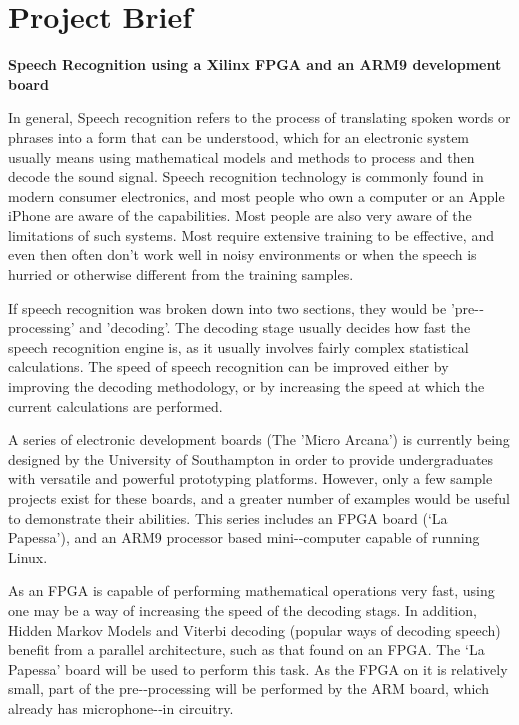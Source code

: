 \chapter{Project Brief} %
\label{apdx:brief}

\begin{center}
\textbf{Speech Recognition using a Xilinx FPGA and an ARM9 development board}
\end{center}

In general, Speech recognition refers to the process of translating spoken words or phrases into a form that can be understood, which for an electronic system usually means using mathematical models and methods to process and then decode the sound signal. Speech recognition technology is commonly found in modern consumer electronics, and most people who own a computer or an Apple iPhone are aware of the capabilities. Most people are also very aware of the limitations of such systems. Most require extensive training to be effective, and even then often don't work well in noisy environments or when the speech is hurried or otherwise different from the training samples.

If speech recognition was broken down into two sections, they would be 'pre-­‐ processing' and 'decoding'. The decoding stage usually decides how fast the speech recognition engine is, as it usually involves fairly complex statistical calculations. The speed of speech recognition can be improved either by improving the decoding methodology, or by increasing the speed at which the current calculations are performed.

A series of electronic development boards (The 'Micro Arcana') is currently being designed by the University of Southampton in order to provide undergraduates with versatile and powerful prototyping platforms. However, only a few sample projects exist for these boards, and a greater number of examples would be useful to demonstrate their abilities. This series includes an FPGA board (‘La Papessa’), and an ARM9 processor based mini-­‐computer capable of running Linux.

As an FPGA is capable of performing mathematical operations very fast, using one may be a way of increasing the speed of the decoding stags. In addition, Hidden Markov Models and Viterbi decoding (popular ways of decoding speech) benefit from a parallel architecture, such as that found on an FPGA. The ‘La Papessa’ board will be used to perform this task. As the FPGA on it is relatively small, part of the pre-­‐processing will be performed by the ARM board, which already has microphone-­‐in circuitry.

